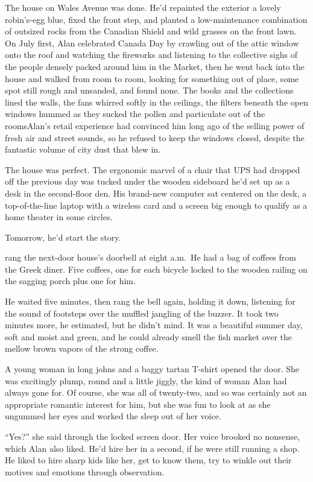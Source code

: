 The house on Wales Avenue was done.  He'd repainted the exterior a
lovely robin's-egg blue, fixed the front step, and planted a
low-maintenance combination of outsized rocks from the Canadian Shield
and wild grasses on the front lawn.  On July first, Alan celebrated
Canada Day by crawling out of the attic window onto the roof and
watching the fireworks and listening to the collective sighs of the
people densely packed around him in the Market, then he went back into
the house and walked from room to room, looking for something out of
place, some spot still rough and unsanded, and found none.  The books
and the collections lined the walls, the fans whirred softly in the
ceilings, the filters beneath the open windows hummed as they sucked
the pollen and particulate out of the rooms\dash{}Alan's retail experience
had convinced him long ago of the selling power of fresh air and
street sounds, so he refused to keep the windows closed, despite the
fantastic volume of city dust that blew in.

The house was perfect.  The ergonomic marvel of a chair that UPS had
dropped off the previous day was tucked under the wooden sideboard
he'd set up as a desk in the second-floor den.  His brand-new computer
sat centered on the desk, a top-of-the-line laptop with a wireless
card and a screen big enough to qualify as a home theater in some
circles.

Tomorrow, he'd start the story.

 rang the next-door house's doorbell at eight a.m.\  He had a bag
of coffees from the Greek diner.  Five coffees, one for each bicycle
locked to the wooden railing on the sagging porch plus one for him.

He waited five minutes, then rang the bell again, holding it down,
listening for the sound of footsteps over the muffled jangling of the
buzzer.  It took two minutes more, he estimated, but he didn't mind. 
It was a beautiful summer day, soft and moist and green, and he could
already smell the fish market over the mellow brown vapors of the
strong coffee.

A young woman in long johns and a baggy tartan T-shirt opened the
door.  She was excitingly plump, round and a little jiggly, the kind
of woman Alan had always gone for.  Of course, she was all of
twenty-two, and so was certainly not an appropriate romantic interest
for him, but she was fun to look at as she ungummed her eyes and
worked the sleep out of her voice.

``Yes?'' she said through the locked screen door.  Her voice brooked
no nonsense, which Alan also liked.  He'd hire her in a second, if he
were still running a shop.  He liked to hire sharp kids like her, get
to know them, try to winkle out their motives and emotions through
observation.

